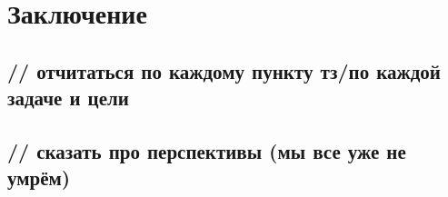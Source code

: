 \chapter{Заключение}

%
\section{// отчитаться по каждому пункту тз/по каждой задаче и цели}

%
\section{// сказать про перспективы (мы все уже не умрём)}

